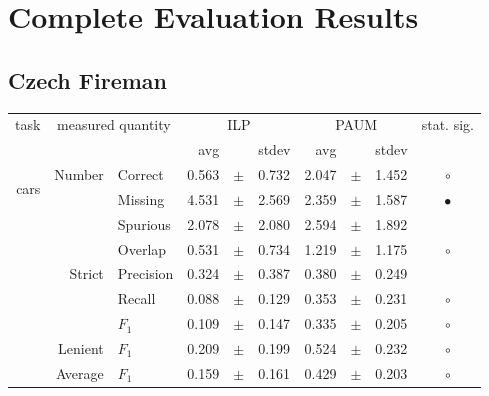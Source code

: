 \chapter{Complete Evaluation Results}

\section{Czech Fireman}

\begin{longtable}{|r|r|l||rcl|rcl|c|}
\hline
\multirow{2}{*}{task} & \multicolumn{2}{|c||}{\multirow{2}{*}{measured quantity}} & \multicolumn{3}{|c|}{ILP} & \multicolumn{3}{|c|}{PAUM} & \multirow{2}{*}{ stat. sig.}\\
\cline{4-9}
  & \multicolumn{2}{|c||}{} &  avg  &    &  stdev  &  avg  &    &  stdev  & \\
\hline
\endhead
\hline
\hline
\multirow{11}{*}{\begin{sideways}cars\end{sideways} }
             & \multirow{4}{*}{    Number} &         Correct &       0.563 &  $\pm$  &       0.732 &       2.047 &  $\pm$  &       1.452 & $\circ$ \\
\cline{3-10} &                             &         Missing &       4.531 &  $\pm$  &       2.569 &       2.359 &  $\pm$  &       1.587 & $\bullet$ \\
\cline{3-10} &                             &        Spurious &       2.078 &  $\pm$  &       2.080 &       2.594 &  $\pm$  &       1.892 &  \\
\cline{3-10} &                             &         Overlap &       0.531 &  $\pm$  &       0.734 &       1.219 &  $\pm$  &       1.175 & $\circ$ \\
\cline{2-10} & \multirow{3}{*}{    Strict} &       Precision &       0.324 &  $\pm$  &       0.387 &       0.380 &  $\pm$  &       0.249 &  \\
\cline{3-10} &                             &          Recall &       0.088 &  $\pm$  &       0.129 &       0.353 &  $\pm$  &       0.231 & $\circ$ \\
\cline{3-10} &                             &           $F_1$ &       0.109 &  $\pm$  &       0.147 &       0.335 &  $\pm$  &       0.205 & $\circ$ \\
\cline{2-10} &                     Lenient &           $F_1$ &       0.209 &  $\pm$  &       0.199 &       0.524 &  $\pm$  &       0.232 & $\circ$ \\
\cline{2-10} &                     Average &           $F_1$ &       0.159 &  $\pm$  &       0.161 &       0.429 &  $\pm$  &       0.203 & $\circ$ \\

\end{longtable}
